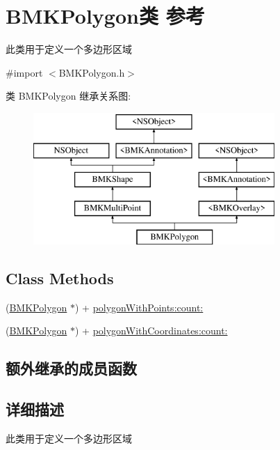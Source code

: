 \hypertarget{interface_b_m_k_polygon}{}\section{B\+M\+K\+Polygon类 参考}
\label{interface_b_m_k_polygon}


此类用于定义一个多边形区域  




{\ttfamily \#import $<$B\+M\+K\+Polygon.\+h$>$}

类 B\+M\+K\+Polygon 继承关系图\+:\begin{figure}[H]
\begin{center}
\leavevmode
\includegraphics[height=5.000000cm]{interface_b_m_k_polygon}
\end{center}
\end{figure}
\subsection*{Class Methods}
\begin{DoxyCompactItemize}
\item 
(\hyperlink{interface_b_m_k_polygon}{B\+M\+K\+Polygon} $\ast$) + \hyperlink{interface_b_m_k_polygon_a74b92a200709fb4c6718b26ebdfcc50a}{polygon\+With\+Points\+:count\+:}
\item 
(\hyperlink{interface_b_m_k_polygon}{B\+M\+K\+Polygon} $\ast$) + \hyperlink{interface_b_m_k_polygon_aa3de0deeba040969c9211b64c59831f2}{polygon\+With\+Coordinates\+:count\+:}
\end{DoxyCompactItemize}
\subsection*{额外继承的成员函数}


\subsection{详细描述}
此类用于定义一个多边形区域 

